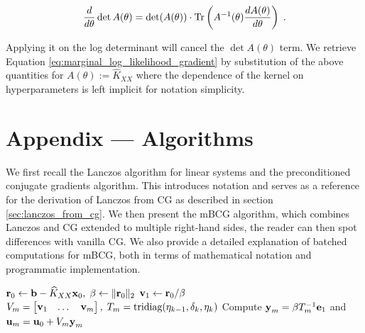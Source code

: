\documentclass{article}
\begin{document}
{\begin{equation*}
    \frac{d}{d \theta} \det A(\theta) = \det (A(\theta)) \cdot \operatorname{Tr} \left( A^{-1}(\theta) \frac{d A(\theta)}{d \theta} \right) \; .
\end{equation*}

Applying it on the log determinant will cancel the $\det A(\theta)$ term. We retrieve Equation \eqref{eq:marginal_log_likelihood_gradient} by substitution of the above quantities for $A(\theta) := \widehat K_{XX}$ where the dependence of the kernel on hyperparameters is left implicit for notation simplicity.


\section{Appendix --- Algorithms}

We first recall the Lanczos algorithm for linear systems and the preconditioned conjugate gradients algorithm. This introduces notation and serves as a reference for the derivation of Lanczos from CG as described in section \ref{sec:lanczos_from_cg}. We then present the mBCG algorithm, which combines Lanczos and CG extended to multiple right-hand sides, the reader can then spot differences with vanilla CG. We also provide a detailed explanation of batched computations for mBCG, both in terms of mathematical notation and programmatic implementation. 


\vspace{0.5cm}

\begin{algorithm}[H]
 \label{algo:lanczos}
\SetAlgoLined
{}
\DontPrintSemicolon
{}
 $\boldsymbol{\mathbf{r}}_0 \leftarrow \boldsymbol{\mathbf{b}} - \widehat K_{XX} \boldsymbol{\mathbf{x}}_0, \; \beta \leftarrow \Vert \boldsymbol{\mathbf{r}}_0 \Vert_2$ \;
 $\boldsymbol{\mathbf{v}}_1 \leftarrow \boldsymbol{\mathbf{r}}_0 / \beta$ \;
 $V_m = \begin{bmatrix} \boldsymbol{\mathbf{v}}_1 & \dots & \boldsymbol{\mathbf{v}}_m \end{bmatrix}, \; T_m = \text{tridiag}(\eta_{k-1}, \delta_k, \eta_k)$ \;
 Compute $\boldsymbol{\mathbf{y}}_m = \beta T_m^{-1} \boldsymbol{\mathbf{e}}_1$ and $\boldsymbol{\mathbf{u}}_m = \boldsymbol{\mathbf{u}}_0 + V_m \boldsymbol{\mathbf{y}}_m$ \;
 

\end{algorithm}}
\end{document}
